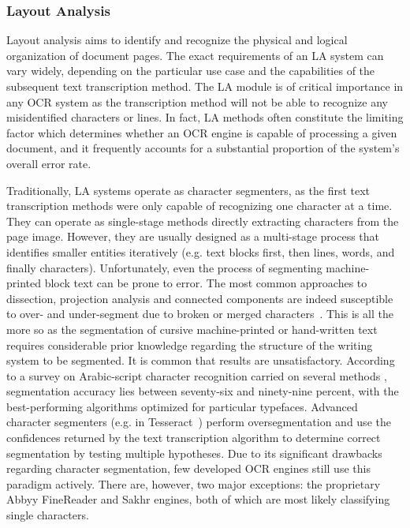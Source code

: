 \subsubsection{Layout Analysis}
\label{s:la}

Layout analysis aims to identify and recognize the physical and logical
organization of document pages. The exact requirements of an LA system can vary
widely, depending on the particular use case and the capabilities of the
subsequent text transcription method. The LA module is of critical importance
in any OCR system as the transcription method will not be able to recognize any
misidentified characters or lines. In fact, LA methods often constitute the
limiting factor which determines whether an OCR engine is capable of processing
a given document, and it frequently accounts for a substantial proportion of
the system’s overall error rate.

Traditionally, LA systems operate as character segmenters, as the first text
transcription methods were only capable of recognizing one character at a time.
They can operate as single-stage methods directly extracting characters from
the page image. However, they are usually designed as a multi-stage process
that identifies smaller entities iteratively (e.g. text blocks first, then
lines, words, and finally characters). Unfortunately, even the process of
segmenting machine-printed block text can be prone to error. The most common
approaches to dissection, projection analysis and connected components are
indeed susceptible to over- and under-segment due to broken or merged
characters~\cite[sec.2]{casey1996survey}. This is all the more so as the
segmentation of cursive machine-printed or hand-written text requires
considerable prior knowledge regarding the structure of the writing system to
be segmented. It is common that results are unsatisfactory. According to a
survey on Arabic-script character recognition carried on several methods
\cite{alginahi2013survey}, segmentation accuracy lies between seventy-six and
ninety-nine percent, with the best-performing algorithms optimized for
particular typefaces. Advanced character segmenters (e.g. in
Tesseract~\cite{smith2007overview}) perform oversegmentation and use the
confidences returned by the text transcription algorithm to determine correct
segmentation by testing multiple hypotheses. Due to its significant drawbacks
regarding character segmentation, few developed OCR engines still use this
paradigm actively. There are, however, two major exceptions: the proprietary
Abbyy FineReader and Sakhr engines, both of which are most likely classifying
single characters.

